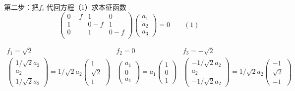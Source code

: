 \begin{frame} 
    第二步：把$f_i$ 代回方程（1）求本征函数
    $$\begin{pmatrix}
        0-f & 1 & 0  \\
        1 & 0-f & 1  \\
        0 & 1 & 0-f \\
     \end{pmatrix} 
     \begin{pmatrix}
         a_1\\
         a_2\\
         a_3
     \end{pmatrix}
     =0 \qquad (1)$$

     $$\begin{matrix}
       f_1=\sqrt{2} & f_2=0  &  f_3=-\sqrt{2}\\
    \begin{pmatrix}
        1/\sqrt{2}a_2\\
        a_2\\
        1/\sqrt{2}a_2
    \end{pmatrix}  
    = 1/\sqrt{2}a_2 \begin{pmatrix}
        1\\
        \sqrt{2}\\
        1
        \end{pmatrix} 
    & 
    \begin{pmatrix}
        a_1\\
        0\\
        a_1
    \end{pmatrix}  
    =  a_1 \begin{pmatrix}
        1\\
        0\\
        1
    \end{pmatrix}
    &
    \begin{pmatrix}
        -1/\sqrt{2}a_2\\
        a_2\\
        -1/\sqrt{2}a_2
    \end{pmatrix} 
    = 1/\sqrt{2}a_2 \begin{pmatrix}
        -1\\
        \sqrt{2}\\
        -1
    \end{pmatrix} 
    \end{matrix}$$           
\end{frame}


